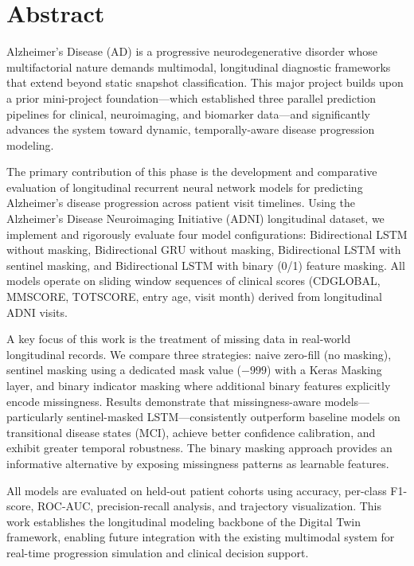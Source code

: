 \documentclass[12pt,singleside,a4paper]{article}
\begin{document}
\section*{Abstract}
Alzheimer's Disease (AD) is a progressive neurodegenerative disorder whose multifactorial nature demands multimodal, longitudinal diagnostic frameworks that extend beyond static snapshot classification. This major project builds upon a prior mini-project foundation—which established three parallel prediction pipelines for clinical, neuroimaging, and biomarker data—and significantly advances the system toward dynamic, temporally-aware disease progression modeling.

The primary contribution of this phase is the development and comparative evaluation of longitudinal recurrent neural network models for predicting Alzheimer's disease progression across patient visit timelines. Using the Alzheimer's Disease Neuroimaging Initiative (ADNI) longitudinal dataset, we implement and rigorously evaluate four model configurations: Bidirectional LSTM without masking, Bidirectional GRU without masking, Bidirectional LSTM with sentinel masking, and Bidirectional LSTM with binary (0/1) feature masking. All models operate on sliding window sequences of clinical scores (CDGLOBAL, MMSCORE, TOTSCORE, entry age, visit month) derived from longitudinal ADNI visits.

A key focus of this work is the treatment of missing data in real-world longitudinal records. We compare three strategies: naive zero-fill (no masking), sentinel masking using a dedicated mask value ($-999$) with a Keras Masking layer, and binary indicator masking where additional binary features explicitly encode missingness. Results demonstrate that missingness-aware models—particularly sentinel-masked LSTM—consistently outperform baseline models on transitional disease states (MCI), achieve better confidence calibration, and exhibit greater temporal robustness. The binary masking approach provides an informative alternative by exposing missingness patterns as learnable features.

All models are evaluated on held-out patient cohorts using accuracy, per-class F1-score, ROC-AUC, precision-recall analysis, and trajectory visualization. This work establishes the longitudinal modeling backbone of the Digital Twin framework, enabling future integration with the existing multimodal system for real-time progression simulation and clinical decision support.

\pagebreak
\end{document}
